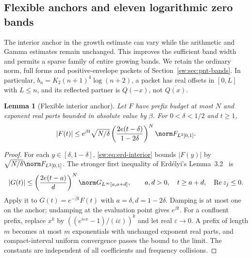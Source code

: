 \documentclass[11pt,a4paper]{article}
\numberwithin{equation}{section}
\newtheorem{lemma}[theorem]{Lemma}
\theoremstyle{definition}\newtheorem{definition}[theorem]{Definition}
\theoremstyle{remark}\newtheorem{remark}[theorem]{Remark}
\DeclareMathOperator{\Rea}{Re}\DeclareMathOperator{\Ima}{Im}
\begin{document}
\subsection{Flexible anchors and eleven logarithmic zero bands}\label{bl:sec:anchor}
The interior anchor in the growth estimate can vary while the arithmetic and Gamma estimates remain unchanged. This improves the sufficient band width and permits a sparse family of entire growing bands. We retain the ordinary norm, full forms and positive-envelope packets of Section~\ref{sw:sec:pnt-bands}. In particular, $b_n=K_2(n+1)^4\log(n+2)$, a packet has real offsets in $[0,L]$ with $L\le n$, and its reflected partner is $Q(-x)$, not $\overline{Q(x)}$.

\begin{lemma}[Flexible interior anchor]\label{bl:anchorlemma}
Let $F$ have prefix budget at most $N$ and exponent real parts bounded in absolute value by $\beta$. For $0<\delta<1/2$ and $t\ge1$,
\begin{equation}\label{bl:flex}
 |F(t)|\le e^{\beta t}\sqrt{N/\delta}
 \left(\frac{2e(t-\delta)}{1-2\delta}\right)^N\norm F_{L^2[0,1]}.
\end{equation}
\end{lemma}
\begin{proof}
For each $y\in[\delta,1-\delta]$, \eqref{sw:eq:erd-interior} bounds $|F(y)|$ by $\sqrt{N/\delta}\norm F_{L^2[0,1]}$. The stronger first inequality of Erd\'elyi's Lemma~3.2~\cite{Erdelyi} is
\[
 |G(t)|\le\left(\frac{2e(t-a)}{d}\right)^N
 \norm G_{L^\infty[a,a+d]},\qquad
 a,d>0,\quad t\ge a+d,\quad \Rea z_j\le0.
\]
Apply it to $G(t)=e^{-\beta t}F(t)$ with $a=\delta,d=1-2\delta$. Damping is at most one on the anchor; undamping at the evaluation point gives $e^{\beta t}$. For a confluent prefix, replace $x^k$ by $((e^{i\varepsilon x}-1)/(i\varepsilon))^k$ and let real $\varepsilon\to0$. A prefix of length $m$ becomes at most $m$ exponentials with unchanged exponent real parts, and compact-interval uniform convergence passes the bound to the limit. The constants are independent of all coefficients and frequency collisions.
\end{proof}
\end{document}
